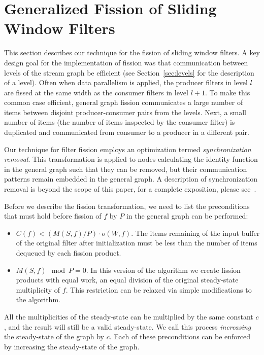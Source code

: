 \section{Generalized Fission of Sliding Window Filters}

This section describes our technique for the fission of sliding window
filters. A key design goal for the implementation of fission 
was that communication between levels of the stream graph be efficient
(see Section~\ref{sec:levels} for the description of a level).  Often
when data parallelism is applied, the producer filters in level $l$ are
fissed at the same width as the consumer filters in level $l + 1$.  To
make this common case efficient, general graph fission communicates a
large number of items between disjoint producer-consumer pairs from the
levels.  Next, a small number of items (the number of items inspected by
the consumer filter) is duplicated and communicated from consumer to a
producer in a different pair.  

Our technique for filter fission employs an optimization termed {\it
  synchronization removal}.  This transformation is applied to nodes
calculating the identity function in the general graph such that they
can be removed, but their communication patterns remain embedded in
the general graph. A description of synchronization removal is beyond
the scope of this paper, for a complete exposition, please
see~\cite{mgordon-phd}.

Before we describe the fission transformation, we need to list the
preconditions that must hold before fission of $f$ by $P$ in the general
graph can be performed:
\begin{itemize}
\item $C(f) < (M(S,f) / P) \cdot o(W, f)$. The items remaining of
  the input buffer of the original filter after initialization must be
  less than the number of items dequeued by each fission product.

\item $M(S,f) \mod P = 0$. In this version of the algorithm we create
  fission products with equal work, an equal division of the original
  steady-state multiplicity of $f$.  This restriction can be relaxed
  via simple modifications to the algorithm.
\end{itemize}
\noindent All the multiplicities of the steady-state can be multiplied
by the same constant $c$, and the result will still be a valid
steady-state.  We call this process {\it increasing} the steady-state
of the graph by $c$.  Each of these preconditions can be enforced by
increasing the steady-state of the graph.

